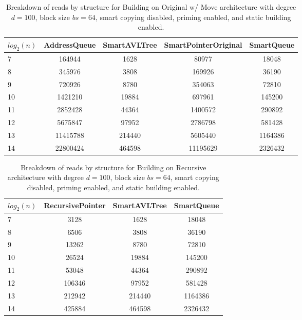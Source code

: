 \begin{table}[]
\centering
\begin{tabular}{|l|c|c|c|c|}
$log_2(n)$ & AddressQueue & SmartAVLTree & SmartPointerOriginal & SmartQueue \\ \hline
7 & 164944 & 1628 & 80977 & 18048 \\ \hline
8 & 345976 & 3808 & 169926 & 36190 \\ \hline
9 & 720926 & 8780 & 354063 & 72810 \\ \hline
10 & 1421210 & 19884 & 697961 & 145200 \\ \hline
11 & 2852428 & 44364 & 1400572 & 290892 \\ \hline
12 & 5675847 & 97952 & 2786798 & 581428 \\ \hline
13 & 11415788 & 214440 & 5605440 & 1164386 \\ \hline
14 & 22800424 & 464598 & 11195629 & 2326432 \\ \hline
\end{tabular}
\caption{Breakdown of reads by structure for Building on Original w/ Move architecture with degree $d=100$, block size $bs=64$, smart copying disabled, priming enabled, and static building enabled.}
    \label{tab:reads_by_structure_build_d100_bs64_copiesfalse_primetrue_staticinsertiontrue_ptoriginal_movetrue}
\end{table}

\begin{table}[]
\centering
\begin{tabular}{|l|c|c|c|}
$log_2(n)$ & RecursivePointer & SmartAVLTree & SmartQueue \\ \hline
7 & 3128 & 1628 & 18048 \\ \hline
8 & 6506 & 3808 & 36190 \\ \hline
9 & 13262 & 8780 & 72810 \\ \hline
10 & 26524 & 19884 & 145200 \\ \hline
11 & 53048 & 44364 & 290892 \\ \hline
12 & 106346 & 97952 & 581428 \\ \hline
13 & 212942 & 214440 & 1164386 \\ \hline
14 & 425884 & 464598 & 2326432 \\ \hline
\end{tabular}
\caption{Breakdown of reads by structure for Building on Recursive architecture with degree $d=100$, block size $bs=64$, smart copying disabled, priming enabled, and static building enabled.}
    \label{tab:reads_by_structure_build_d100_bs64_copiesfalse_primetrue_staticinsertiontrue_ptrecursive_movetrue}
\end{table}

